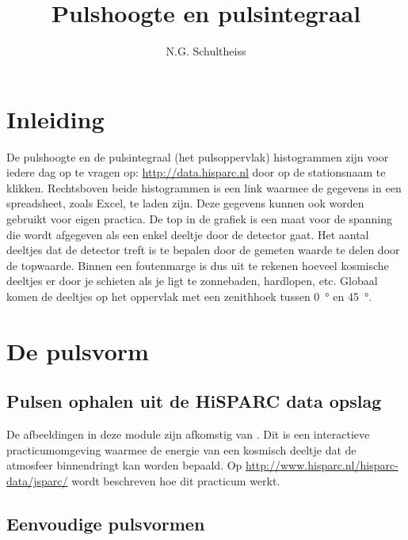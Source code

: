 

\title{Pulshoogte en pulsintegraal}
\author{N.G. Schultheiss}



\maketitle

\section{Inleiding}

De pulshoogte en de pulsintegraal (het pulsoppervlak) histogrammen zijn
voor iedere dag op te vragen op: \url{http://data.hisparc.nl} door op de
stationsnaam te klikken. Rechtsboven beide histogrammen is een link
waarmee de gegevens in een spreadsheet, zoals Excel, te laden zijn. Deze
gegevens kunnen ook worden gebruikt voor eigen practica. De top in de
grafiek is een maat voor de spanning die wordt afgegeven als een enkel
deeltje door de detector gaat. Het aantal deeltjes dat de detector treft
is te bepalen door de gemeten waarde te delen door de topwaarde. Binnen
een foutenmarge is dus uit te rekenen hoeveel kosmische deeltjes er door
je schieten als je ligt te zonnebaden, hardlopen, etc. Globaal komen de
deeltjes op het oppervlak met een zenithhoek tussen \SI{0}{\degree} en
\SI{45}{\degree}.


\section{De pulsvorm}


\subsection{Pulsen ophalen uit de HiSPARC data opslag}

De afbeeldingen in deze module zijn afkomstig van \jsparc. Dit is een
interactieve practicumomgeving waarmee de energie van een kosmisch
deeltje dat de atmosfeer binnendringt kan worden bepaald. Op
\url{http://www.hisparc.nl/hisparc-data/jsparc/} wordt beschreven hoe
dit practicum werkt.


\subsection{Eenvoudige pulsvormen}

